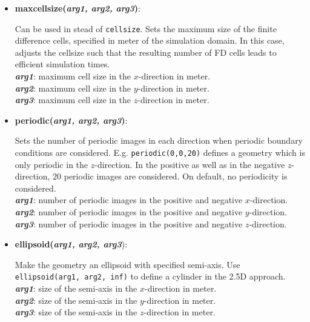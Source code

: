 \begin{itemize}

 \item {\textbf{maxcellsize(\textit{arg1, arg2, arg3})}:
				\flushright\parbox{0.9 \textwidth}{\vspace{-0.25cm} 
				Can be used in stead of \texttt{cellsize}.  Sets the maximum size of the finite difference cells, specified in meter of the simulation domain.  In this case, \mumax adjusts the cellsize such that the resulting number of FD cells leads to efficient simulation times.\\
				\textbf{\textit{arg1}}: maximum cell size in the $x$-direction in meter.\\
				\textbf{\textit{arg2}}: maximum cell size in the $y$-direction in meter.\\
				\textbf{\textit{arg3}}: maximum cell size in the $z$-direction in meter.
				}\flushleft}

 \item {\vspace{-0.4cm}\textbf{periodic(\textit{arg1, arg2, arg3})}:
				\flushright\parbox{0.9 \textwidth}{\vspace{-0.25cm} 
				Sets the number of periodic images in each direction when periodic boundary conditions are considered.  E.g. \texttt{periodic(0,0,20)} defines a geometry which is only periodic in the $z$-direction.  In the positive as well as in the negative $z$-direction, 20 periodic images are considered. On default, no periodicity is considered.\\
				\textbf{\textit{arg1}}: number of periodic images in the positive and negative $x$-direction.\\
				\textbf{\textit{arg2}}: number of periodic images in the positive and negative $y$-direction.\\
				\textbf{\textit{arg3}}: number of periodic images in the positive and negative $z$-direction.
				}\flushleft}

 \item {\vspace{-0.4cm}\textbf{ellipsoid(\textit{arg1, arg2, arg3}}):
				\flushright\parbox{0.9 \textwidth}{\vspace{-0.25cm} 
				Make the geometry an ellipsoid with specified semi-axis.  Use \texttt{ellipsoid(arg1, arg2, inf)} to define a cylinder in the 2.5D approach.\\
				\textbf{\textit{arg1}}: size of the semi-axis in the $x$-direction in meter.\\
				\textbf{\textit{arg2}}: size of the semi-axis in the $y$-direction in meter.\\
				\textbf{\textit{arg3}}: size of the semi-axis in the $z$-direction in meter.
				}\flushleft}

\end{itemize}


